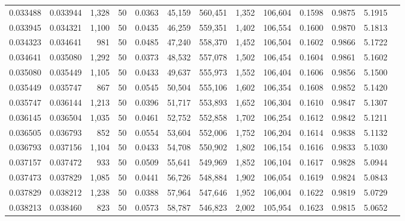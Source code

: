 \begin{tabular}{rrrrrrrrrrrrr}
0.033488 & 0.033944 & 1,328 &  50 &                                     0.0363 &  45,159 & 560,451 &   1,352 & 106,604 & 0.1598 & 0.9875 & 5.1915 \\
0.033945 & 0.034321 & 1,100 &  50 &                                     0.0435 &  46,259 & 559,351 &   1,402 & 106,554 & 0.1600 & 0.9870 & 5.1813 \\
0.034323 & 0.034641 &   981 &  50 &                                     0.0485 &  47,240 & 558,370 &   1,452 & 106,504 & 0.1602 & 0.9866 & 5.1722 \\
0.034641 & 0.035080 & 1,292 &  50 &                                     0.0373 &  48,532 & 557,078 &   1,502 & 106,454 & 0.1604 & 0.9861 & 5.1602 \\
0.035080 & 0.035449 & 1,105 &  50 &                                     0.0433 &  49,637 & 555,973 &   1,552 & 106,404 & 0.1606 & 0.9856 & 5.1500 \\
0.035449 & 0.035747 &   867 &  50 &                                     0.0545 &  50,504 & 555,106 &   1,602 & 106,354 & 0.1608 & 0.9852 & 5.1420 \\
0.035747 & 0.036144 & 1,213 &  50 &                                     0.0396 &  51,717 & 553,893 &   1,652 & 106,304 & 0.1610 & 0.9847 & 5.1307 \\
0.036145 & 0.036504 & 1,035 &  50 &                                     0.0461 &  52,752 & 552,858 &   1,702 & 106,254 & 0.1612 & 0.9842 & 5.1211 \\
0.036505 & 0.036793 &   852 &  50 &                                     0.0554 &  53,604 & 552,006 &   1,752 & 106,204 & 0.1614 & 0.9838 & 5.1132 \\
0.036793 & 0.037156 & 1,104 &  50 &                                     0.0433 &  54,708 & 550,902 &   1,802 & 106,154 & 0.1616 & 0.9833 & 5.1030 \\
0.037157 & 0.037472 &   933 &  50 &                                     0.0509 &  55,641 & 549,969 &   1,852 & 106,104 & 0.1617 & 0.9828 & 5.0944 \\
0.037473 & 0.037829 & 1,085 &  50 &                                     0.0441 &  56,726 & 548,884 &   1,902 & 106,054 & 0.1619 & 0.9824 & 5.0843 \\
0.037829 & 0.038212 & 1,238 &  50 &                                     0.0388 &  57,964 & 547,646 &   1,952 & 106,004 & 0.1622 & 0.9819 & 5.0729 \\
0.038213 & 0.038460 &   823 &  50 &                                     0.0573 &  58,787 & 546,823 &   2,002 & 105,954 & 0.1623 & 0.9815 & 5.0652 \\

\end{tabular}
